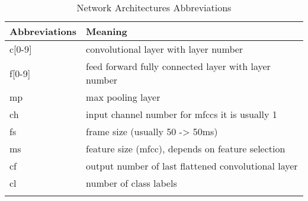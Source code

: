 \begin{table}[ht!]
\begin{center}
\caption{Network Architectures Abbreviations}
\begin{tabular}{ M{2.5cm}  M{10cm} }
\toprule
\textbf{Abbreviations} & \textbf{Meaning}\\
\midrule
c[0-9] & convolutional layer with layer number\\
f[0-9] & feed forward fully connected layer with layer number\\
mp & max pooling layer\\
ch & input channel number for mfccs it is usually 1\\
fs & frame size (usually 50 -> 50ms)\\
ms & feature size (mfcc), depends on feature selection\\
cf & output number of last flattened convolutional layer\\
cl & number of class labels\\
\bottomrule
\label{tab:nn_arch_abbreviation}
\end{tabular}
\end{center}
\end{table}
\FloatBarrier
\noindent